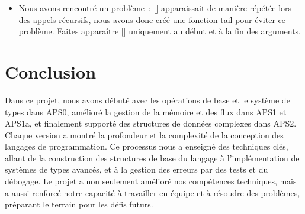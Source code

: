 \documentclass{article}
\begin{document}
\begin{itemize}
		\item Nous avons rencontré un problème : [] apparaissait de manière répétée lors des appels récursifs, nous avons donc créé une fonction tail pour éviter ce problème. Faites apparaître [] uniquement au début et à la fin des arguments.

	\end{itemize}


	
\section{Conclusion}

Dans ce projet, nous avons débuté avec les opérations de base et le système de types dans APS0, amélioré la gestion de la mémoire et des flux dans APS1 et APS1a, et finalement supporté des structures de données complexes dans APS2. Chaque version a montré la profondeur et la complexité de la conception des langages de programmation. Ce processus nous a enseigné des techniques clés, allant de la construction des structures de base du langage à l'implémentation de systèmes de types avancés, et à la gestion des erreurs par des tests et du débogage. Le projet a non seulement amélioré nos compétences techniques, mais a aussi renforcé notre capacité à travailler en équipe et à résoudre des problèmes, préparant le terrain pour les défis futurs.

	
	

	
\end{document}
